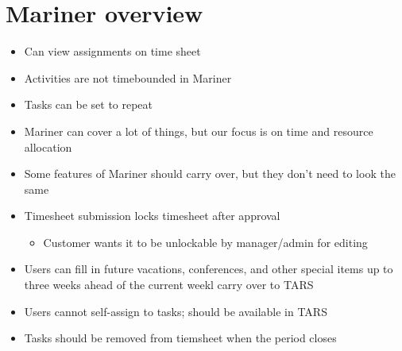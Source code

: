 \documentclass{article}
\begin{document}
\section{Mariner overview}
\begin{itemize}
\item Can view assignments on time sheet
\item Activities are not timebounded in Mariner
\item Tasks can be set to repeat
\item Mariner can cover a lot of things, but our focus is on time and resource allocation
\item Some features of Mariner should carry over, but they don't need to look the same
\item Timesheet submission locks timesheet after approval
	\begin{itemize}
	\item Customer wants it to be unlockable by manager/admin for editing
	\end{itemize}
\item Users can fill in future vacations, conferences, and other special items up to three weeks ahead of the current weekl carry over to TARS
\item Users cannot self-assign to tasks; should be available in TARS
\item Tasks should be removed from tiemsheet when the period closes
\end{itemize}
\end{document}
